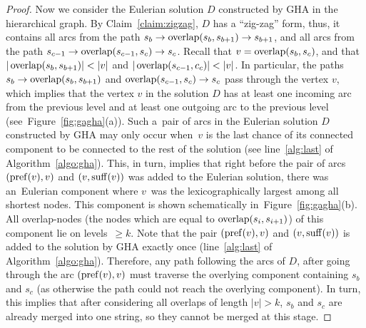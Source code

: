 \begin{proof}
Now we consider the Eulerian solution $D$ constructed by GHA in the hierarchical graph.
By Claim~\ref{claim:zigzag}, $D$ has a ``zig-zag'' form, thus, it contains all arcs from the path $s_b\to\operatorname{overlap}(s_{b}, s_{b+1}) \to s_{b+1}$, and all arcs from the path $s_{c-1}\to\operatorname{overlap}(s_{c-1}, s_{c}) \to s_{c}$. Recall that $v=\operatorname{overlap}(s_b,s_c)$, and that $|\overlap(s_b,s_{b+1})| <|v|$ and $|\operatorname{overlap}(s_{c-1},c_c)|< |v|$. In particular, the paths $s_b\to\operatorname{overlap}(s_{b}, s_{b+1})$ and $\operatorname{overlap}(s_{c-1}, s_{c}) \to s_{c}$ pass through the vertex $v$, which implies that the vertex $v$ in the solution $D$ has at least one incoming arc from the previous level and at least one outgoing arc to the previous level (see~Figure~\ref{fig:gagha}(a)). Such a~pair of arcs in the Eulerian solution $D$ constructed by GHA may only occur when~$v$ is the last chance of
its connected component to be connected to the rest of the solution (see line~\ref{alg:last} of Algorithm~\ref{algo:gha}). This, in turn, implies that right before the pair of arcs $(\operatorname{pref}(v), v)$ and $(v, \operatorname{suff}(v))$ was added to the Eulerian solution, there was an~Eulerian component where $v$~was the lexicographically largest among all shortest nodes. This component is shown schematically in~Figure~\ref{fig:gagha}(b). All overlap-nodes (the nodes which are equal to $\operatorname{overlap}(s_i,s_{i+1})$) of this component lie on levels~$\geq k$. Note that the pair $(\operatorname{pref}(v), v)$ and $(v, \operatorname{suff}(v))$ is added to the solution by GHA exactly once (line~\ref{alg:last} of Algorithm~\ref{algo:gha}). Therefore, any path following the arcs of $D$, after going through the arc $(\operatorname{pref}(v), v)$ must traverse the overlying component containing $s_b$ and $s_c$ (as otherwise the path could not reach the overlying component). In turn, this implies that after considering all overlaps of length $|v|>k$, $s_b$ and $s_c$ are already merged into one string, so they cannot be merged at this stage.


\end{proof}
